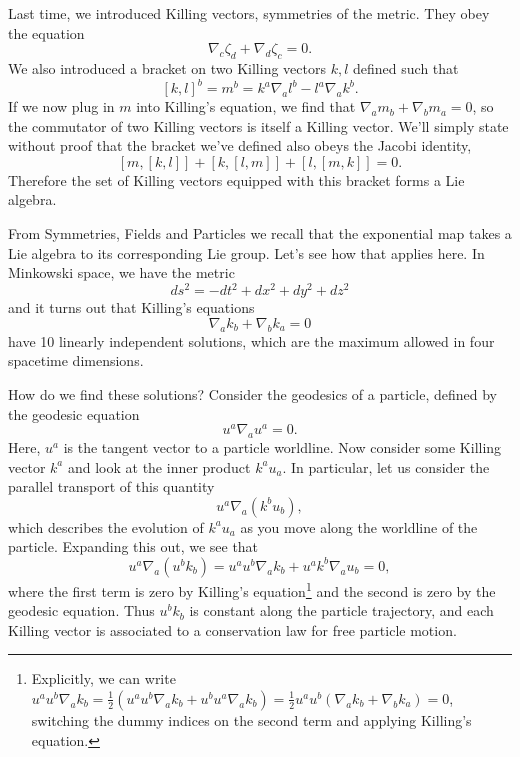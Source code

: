 Last time, we introduced Killing vectors, symmetries of the metric. They obey the equation
$$\nabla_c \zeta_d +\nabla_d \zeta_c=0.$$
We also introduced a bracket on two Killing vectors $k,l$ defined such that
$$[k,l]^b=m^b=k^a \nabla_a l^b-l^a\nabla_a k^b.$$ If we now plug in $m$ into Killing's equation, we find that 
$\nabla_a m_b + \nabla_b m_a=0$, so the commutator of two Killing vectors is itself a Killing vector. We'll simply state without proof that the bracket we've defined also obeys the Jacobi identity,
$$[m,[k,l]]+[k,[l,m]]+[l,[m,k]]=0.$$
Therefore the set of Killing vectors equipped with this bracket forms a Lie algebra.

From Symmetries, Fields and Particles we recall that the exponential map takes a Lie algebra to its corresponding Lie group. Let's see how that applies here. In Minkowski space, we have the metric
$$ds^2=-dt^2+dx^2+dy^2+dz^2$$
and it turns out that Killing's equations
$$\nabla_a k_b +\nabla_b k_a=0$$
have 10 linearly independent solutions, which are the maximum allowed in four spacetime dimensions.

How do we find these solutions? Consider the geodesics of a particle, defined by the geodesic equation
$$u^a \nabla_a u^a =0.$$
Here, $u^a$ is the tangent vector to a particle worldline. Now consider some Killing vector $k^a$ and look at the inner product $k^a u_a$. In particular, let us consider the parallel transport of this quantity
$$u^a \nabla_a(k^b u_b),$$
which describes the evolution of $k^a u_a$ as you move along the worldline of the particle.
Expanding this out, we see that
$$u^a\nabla_a (u^bk_b)=u^a u^b \nabla_a k_b + u^a k^b \nabla_a u_b=0,$$
where the first term is zero by Killing's equation\footnote{Explicitly, we can write $u^a u^b \nabla_a k_b = \frac{1}{2}(u^a u^b \nabla_a k_b + u^b u^a \nabla_a k_b)=\frac{1}{2}u^a u^b (\nabla_a k_b+ \nabla_b k_a)=0$, switching the dummy indices on the second term and applying Killing's equation.} and the second is zero by the geodesic equation. Thus $u^b k_b$ is constant along the particle trajectory, and each Killing vector is associated to a conservation law for free particle motion.

